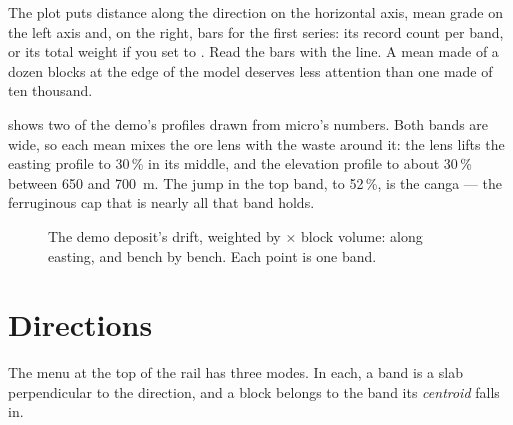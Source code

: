 
The plot puts distance along the direction on the horizontal axis, mean grade on the left axis and, on the right, bars for the first series: its record count per band, or its total weight if you set  to . Read the bars with the line. A mean made of a dozen blocks at the edge of the model deserves less attention than one made of ten thousand.

 shows two of the demo's profiles drawn from micro's numbers. Both bands are wide, so each mean mixes the ore lens with the waste around it: the lens lifts the easting profile to 30\,\% in its middle, and the elevation profile to about 30\,\% between 650 and 700~m. The jump in the top band, to 52\,\%, is the canga — the ferruginous cap that is nearly all that band holds.

\begin{figure}[htbp]\centering
{}\hfill
{}
\caption{The demo deposit's  drift, weighted by  × block volume: along easting, and bench by bench. Each point is one band.}\label{fig:swath-demo}
\end{figure}

\section{Directions}\label{sec:swath-directions}
The  menu at the top of the rail has three modes. In each, a band is a slab perpendicular to the direction, and a block belongs to the band its \emph{centroid} falls in.

